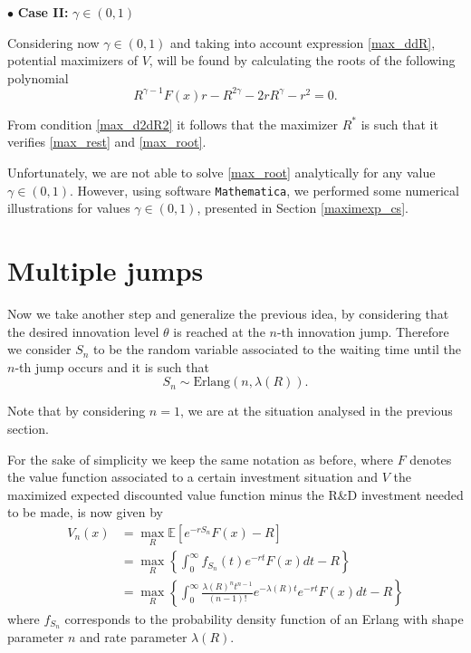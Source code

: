 $\bullet$ \textbf{Case II:} $\gamma \in (0,1) $

Considering now $\gamma \in (0,1) $ and taking into account expression \eqref{max_ddR}, potential maximizers of $V$, %
will be found by calculating the roots of the following polynomial
\begin{equation}
R^{\gamma-1}F(x)r-R^{2\gamma}-2rR^\gamma-r^2=0.
 \label{max_root}
\end{equation}


From condition \eqref{max_d2dR2} it follows that the maximizer $R^*$ is such that it verifies \eqref{max_rest} and \eqref{max_root}.

Unfortunately, we are not able to solve \eqref{max_root} analytically for any value $\gamma \in (0,1) $. However, using software \texttt{Mathematica}, we performed some numerical illustrations for values $\gamma \in (0,1)$, presented in Section \ref{maximexp_cs}.


\section{Multiple jumps}
\label{section:max_jumps}

Now we take another step and generalize the previous idea, by considering that the desired innovation level $\theta$ is reached at the $n$-th innovation jump.
Therefore we consider $S_n$ to be the random variable associated to the waiting time until the $n$-th jump occurs and it is such that
$$S_n \sim \text{Erlang}(n,\lambda(R)).$$

Note that by considering $n=1$, we are at the situation analysed in the previous section.

For the sake of simplicity we keep the same notation as before, where $F$ denotes the value function associated to a certain investment situation and $V$ the maximized expected discounted value function minus the R\&D investment needed to be made, is now given by
\begin{align}
V_n(x)&=\max_R \mathds{E} [ e^{-rS_n}F(x)-R] \nonumber \\
&=\max_R  \left\{ \int_0 ^\infty f_{S_n}(t) e^{-rt} F(x) dt -R \right\} \nonumber \\
&=\max_R  \left\{ \int_0 ^\infty \frac{\lambda(R)^n t^{n-1}}{(n-1)!} e^{-\lambda(R)t} e^{-rt} F(x) dt -R \right\}
\label{max_2V}
\end{align}
where $f_{S_n}$ corresponds to the probability density function of an Erlang with shape parameter $n$ and rate parameter $\lambda(R)$.

